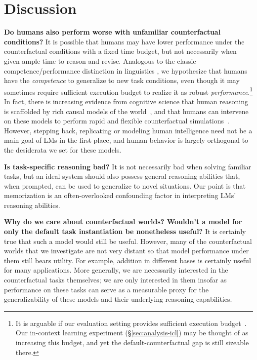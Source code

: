\section{Discussion} \label{sec:discussion}


\textbf{Do humans also perform worse with unfamiliar counterfactual conditions?}
It is possible that humans may have lower performance under the counterfactual conditions with a fixed time budget, but not necessarily when given ample time to reason and revise. Analogous to the classic competence/performance distinction in linguistics \cite[\S1.1]{chomsky1965}, we hypothesize that humans have the \emph{competence} to generalize to new task conditions, even though it may sometimes require sufficient execution budget to realize it as robust \emph{performance}.\footnote{It is arguable if our evaluation setting provides sufficient execution budget~\citep{lampinen2023language}. Our in-context learning experiment (\S\ref{sec:analysis-icl}) may be thought of as increasing this budget, and yet the default-counterfactual gap is still sizeable there.}
In fact, there is increasing evidence from cognitive science that human reasoning is scaffolded by rich causal models of the world~\citep{pearl1988,Lake2017-LAKBMT,ullman2020bayesian,wong2023word}, and that humans can intervene on these models to perform rapid and flexible counterfactual simulations~\citep{Lagnado2013CausalRA,Gerstenberg2017EyeTrackingC,Gerstenberg2021ACS}.
However, stepping back, replicating or modeling human intelligence need not be a main goal of LMs in the first place, and human behavior is largely orthogonal to the desiderata we set for these models.

\textbf{Is task-specific reasoning bad?}
It is not necessarily bad when solving familiar tasks, but an ideal system should also possess general reasoning abilities that, when prompted, can be used to generalize to novel situations. Our point is that memorization is an often-overlooked confounding factor in interpreting LMs' reasoning abilities.

\textbf{Why do we care about counterfactual worlds? Wouldn't a model for only the default task instantiation be nonetheless useful?}
It is certainly true that such a model would  still be useful. However, many of the counterfactual worlds that we investigate are not very distant so that model performance under them still bears utility. For example, addition in different bases is certainly useful for many applications. More generally, we are necessarily interested in the counterfactual tasks themselves; we are only interested in them insofar as performance on these tasks can serve as a measurable proxy for the generalizability of these models and their underlying reasoning capabilities. %




